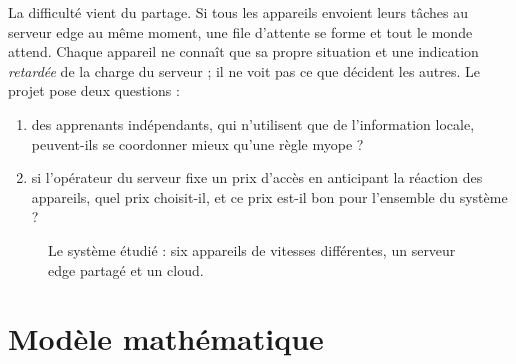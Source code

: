 \documentclass[11pt,a4paper]{article}
\begin{document}
La difficulté vient du partage. Si tous les appareils envoient leurs tâches au serveur edge au même moment, une
file d'attente se forme et tout le monde attend. Chaque appareil ne connaît que sa propre situation et une
indication \emph{retardée} de la charge du serveur ; il ne voit pas ce que décident les autres. Le projet pose
deux questions :
\begin{enumerate}
  \item des apprenants indépendants, qui n'utilisent que de l'information locale, peuvent-ils se coordonner
        mieux qu'une règle myope ?
  \item si l'opérateur du serveur fixe un prix d'accès en anticipant la réaction des appareils, quel prix
        choisit-il, et ce prix est-il bon pour l'ensemble du système ?
\end{enumerate}

\begin{figure}[h]
\centering
{}
\caption{Le système étudié : six appareils de vitesses différentes, un serveur edge partagé et un cloud.}
\label{fig:systeme}
\end{figure}

\section{Modèle mathématique}
\end{document}
